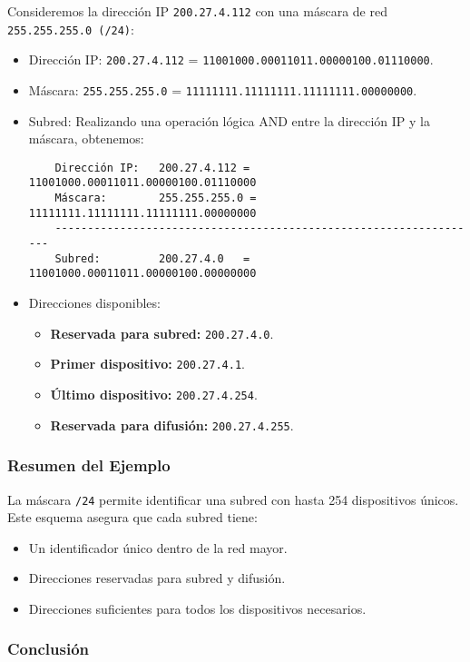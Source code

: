\documentclass[a4paper,12pt]{article}
\begin{document}
Consideremos la dirección IP \texttt{200.27.4.112} con una máscara de red \texttt{255.255.255.0 (/24)}:
\begin{itemize}
    \item Dirección IP: \texttt{200.27.4.112} = \texttt{11001000.00011011.00000100.01110000}.
    \item Máscara: \texttt{255.255.255.0} = \texttt{11111111.11111111.11111111.00000000}.
    \item Subred: Realizando una operación lógica AND entre la dirección IP y la máscara, obtenemos:
    \begin{verbatim}
    Dirección IP:   200.27.4.112 = 11001000.00011011.00000100.01110000
    Máscara:        255.255.255.0 = 11111111.11111111.11111111.00000000
    ------------------------------------------------------------------
    Subred:         200.27.4.0   = 11001000.00011011.00000100.00000000
    \end{verbatim}
    \item Direcciones disponibles:
    \begin{itemize}
        \item \textbf{Reservada para subred:} \texttt{200.27.4.0}.
        \item \textbf{Primer dispositivo:} \texttt{200.27.4.1}.
        \item \textbf{Último dispositivo:} \texttt{200.27.4.254}.
        \item \textbf{Reservada para difusión:} \texttt{200.27.4.255}.
    \end{itemize}
\end{itemize}

\subsubsection*{Resumen del Ejemplo}

La máscara \texttt{/24} permite identificar una subred con hasta 254 dispositivos únicos. Este esquema asegura que cada subred tiene:
\begin{itemize}
    \item Un identificador único dentro de la red mayor.
    \item Direcciones reservadas para subred y difusión.
    \item Direcciones suficientes para todos los dispositivos necesarios.
\end{itemize}

\subsubsection*{Conclusión}
\end{document}

